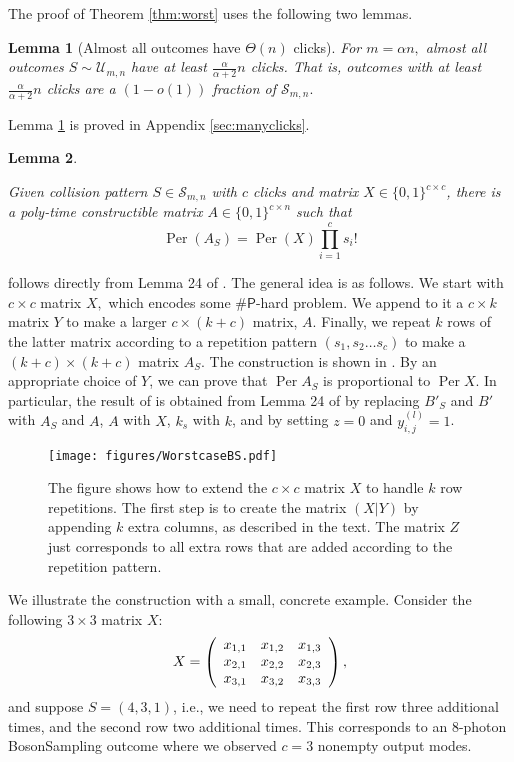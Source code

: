 \documentclass[11pt]{article}
\theoremstyle{plain}
\theoremstyle{plain}
\newtheorem{lem}{Lemma}
\theoremstyle{plain}
\theoremstyle{plain}
\theoremstyle{plain}
\theoremstyle{plain}
\theoremstyle{plain}
\theoremstyle{remark}
\theoremstyle{remark}
\theoremstyle{plain}
\theoremstyle{plain}
\theoremstyle{plain}
\theoremstyle{plain}
\newcommand{\Per}{\operatorname{Per}}
\newcommand{\Smn}{\mathcal{S}_{m,n}}
\newcommand{\sharP}{\#\mathsf{P}}
\begin{document}
The proof of Theorem \ref{thm:worst} uses the following two lemmas. 


\begin{lem}[Almost all outcomes have $\Theta(n)$ clicks]\label{lem:clicksinformal}
    For $m=\alpha n,$ almost all outcomes $S\sim\mathcal U_{m,n}$ have at least $\frac{\alpha}{\alpha+2}n$ clicks. That is, outcomes with at least $\frac{\alpha}{\alpha+2}n$ clicks are a $(1-o(1))$ fraction of $\Smn.$
\end{lem}

Lemma \ref{lem:clicksinformal} is proved in Appendix \ref{sec:manyclicks}.

\begin{lem} 
\label{lem:rep_embedding}

Given collision pattern $S\in\Smn$ with $c$ clicks and matrix $X \in \{0, 1\}^{c \times c}$, there is a poly-time constructible matrix $A \in \{0, 1\}^{c \times n}$ such that 
\[
\Per(A_S) = \Per(X) \prod_{i=1}^c s_i!
\]
\end{lem}


 follows directly from Lemma 24 of \cite{grier_brod_2021}. The general idea is as follows. We start with $c \times c$ matrix $X,$ which encodes some $\sharP$-hard problem. We append to it a $c \times k$ matrix $Y$ to make a larger $c \times (k+c)$ matrix, $A$. Finally, we repeat $k$ rows of the latter matrix according to a repetition pattern $(s_1, s_2 \ldots s_c)$ to make a $(k+c) \times (k+c)$ matrix $A_S$. The construction is shown in  . By an appropriate choice of $Y$, we can prove that $\Per A_S$ is proportional to $\Per X$. In particular, the result of  is obtained from Lemma 24 of \cite{grier_brod_2021} by replacing $B'_S$ and $B'$ with $A_S$ and $A$, $A$ with $X$, $k_s$ with $k$, and by setting $z=0$ and $y_{i,j}^{(l)}=1$. 

\begin{figure}
\centering    \texttt{[image: figures/WorstcaseBS.pdf]}
    \caption{The figure shows how to extend the $c \times c$ matrix $X$ to handle $k$ row repetitions. The first step is to create the matrix $(X|Y)$ by appending $k$ extra columns, as described in the text. The matrix $Z$ just corresponds to all extra rows that are added according to the repetition pattern.}
    \label{Fig:repetitions}
\end{figure}

We illustrate the construction with a small, concrete example. Consider the following $3\times3$ matrix $X$:
\begin{equation}
X = \left(\begin{array}{c c c}
x_{1,1} & x_{1,2} & x_{1,3} \\
x_{2,1} & x_{2,2} & x_{2,3} \\
x_{3,1} & x_{3,2} & x_{3,3}
\end{array}\right),
\end{equation}
and suppose $S=(4,3,1)$, i.e., we need to repeat the first row three additional times, and the second row two additional times. This corresponds to an 8-photon BosonSampling outcome where we observed $c=3$ nonempty output modes. 
\end{document}
